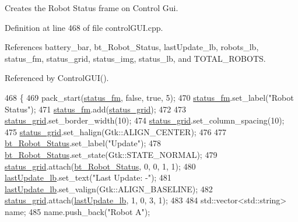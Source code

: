 Creates the \textquotesingle{}Robot Status\textquotesingle{} frame on Control Gui. 



Definition at line 468 of file control\+G\+U\+I.\+cpp.



References battery\+\_\+bar, bt\+\_\+\+Robot\+\_\+\+Status, last\+Update\+\_\+lb, robots\+\_\+lb, status\+\_\+fm, status\+\_\+grid, status\+\_\+img, status\+\_\+lb, and T\+O\+T\+A\+L\+\_\+\+R\+O\+B\+O\+TS.



Referenced by Control\+G\+U\+I().


\begin{DoxyCode}
468                                       \{
469     pack\_start(\hyperlink{class_control_g_u_i_a848cb9908ed55ec6d3ef9676d5c1dea6}{status\_fm}, \textcolor{keyword}{false}, \textcolor{keyword}{true}, 5);
470     \hyperlink{class_control_g_u_i_a848cb9908ed55ec6d3ef9676d5c1dea6}{status\_fm}.set\_label(\textcolor{stringliteral}{"Robot Status"});
471     \hyperlink{class_control_g_u_i_a848cb9908ed55ec6d3ef9676d5c1dea6}{status\_fm}.add(\hyperlink{class_control_g_u_i_a9540bafb29ed9fb1c563a92a65617f10}{status\_grid});
472 
473     \hyperlink{class_control_g_u_i_a9540bafb29ed9fb1c563a92a65617f10}{status\_grid}.set\_border\_width(10);
474     \hyperlink{class_control_g_u_i_a9540bafb29ed9fb1c563a92a65617f10}{status\_grid}.set\_column\_spacing(10);
475     \hyperlink{class_control_g_u_i_a9540bafb29ed9fb1c563a92a65617f10}{status\_grid}.set\_halign(Gtk::ALIGN\_CENTER);
476 
477     \hyperlink{class_control_g_u_i_aa41e46c34d55d0d4c7b53ed2fa14deb8}{bt\_Robot\_Status}.set\_label(\textcolor{stringliteral}{"Update"});
478     \hyperlink{class_control_g_u_i_aa41e46c34d55d0d4c7b53ed2fa14deb8}{bt\_Robot\_Status}.set\_state(Gtk::STATE\_NORMAL);
479     \hyperlink{class_control_g_u_i_a9540bafb29ed9fb1c563a92a65617f10}{status\_grid}.attach(\hyperlink{class_control_g_u_i_aa41e46c34d55d0d4c7b53ed2fa14deb8}{bt\_Robot\_Status}, 0, 0, 1, 1);
480     \hyperlink{class_control_g_u_i_afe6bb1a7eb11e33cfa1fe089c4bfcd2d}{lastUpdate\_lb}.set\_text(\textcolor{stringliteral}{"Last Update: -"});
481     \hyperlink{class_control_g_u_i_afe6bb1a7eb11e33cfa1fe089c4bfcd2d}{lastUpdate\_lb}.set\_valign(Gtk::ALIGN\_BASELINE);
482     \hyperlink{class_control_g_u_i_a9540bafb29ed9fb1c563a92a65617f10}{status\_grid}.attach(\hyperlink{class_control_g_u_i_afe6bb1a7eb11e33cfa1fe089c4bfcd2d}{lastUpdate\_lb}, 1, 0, 3, 1);
483 
484     std::vector<std::string> name;
485     name.push\_back(\textcolor{stringliteral}{"Robot A"});

\end{DoxyCode}
